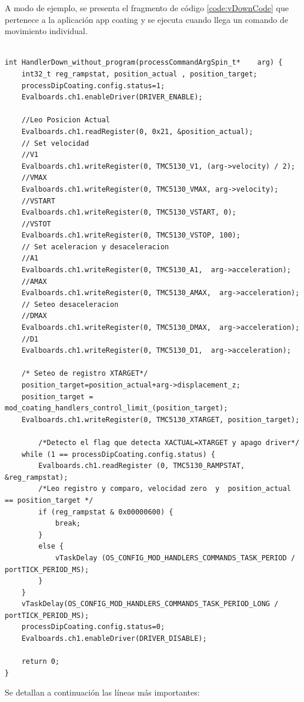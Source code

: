 A modo de ejemplo, se presenta el fragmento de código \ref{code:vDownCode} que pertenece a la aplicación app coating y se ejecuta cuando llega un comando de movimiento individual.


\begin{lstlisting}[label=code:vDownCode,caption=Ejecución de comando DOWN.] % 

int HandlerDown_without_program(processCommandArgSpin_t*	arg) {
	int32_t reg_rampstat, position_actual , position_target;
	processDipCoating.config.status=1;
	Evalboards.ch1.enableDriver(DRIVER_ENABLE);

	//Leo Posicion Actual
	Evalboards.ch1.readRegister(0, 0x21, &position_actual);
	// Set velocidad
	//V1
	Evalboards.ch1.writeRegister(0, TMC5130_V1, (arg->velocity) / 2);
	//VMAX
	Evalboards.ch1.writeRegister(0, TMC5130_VMAX, arg->velocity);
	//VSTART
	Evalboards.ch1.writeRegister(0, TMC5130_VSTART, 0);
	//VSTOT
	Evalboards.ch1.writeRegister(0, TMC5130_VSTOP, 100);
	// Set aceleracion y desaceleracion
	//A1
	Evalboards.ch1.writeRegister(0, TMC5130_A1,  arg->acceleration);
	//AMAX
	Evalboards.ch1.writeRegister(0, TMC5130_AMAX,  arg->acceleration);
	// Seteo desaceleracion
	//DMAX
	Evalboards.ch1.writeRegister(0, TMC5130_DMAX,  arg->acceleration);
	//D1
	Evalboards.ch1.writeRegister(0, TMC5130_D1,  arg->acceleration);

	/* Seteo de registro XTARGET*/
	position_target=position_actual+arg->displacement_z;
	position_target = mod_coating_handlers_control_limit_(position_target);
	Evalboards.ch1.writeRegister(0, TMC5130_XTARGET, position_target);

		/*Detecto el flag que detecta XACTUAL=XTARGET y apago driver*/
	while (1 == processDipCoating.config.status) {
		Evalboards.ch1.readRegister (0, TMC5130_RAMPSTAT, &reg_rampstat);
		/*Leo registro y comparo, velocidad zero  y  position_actual == position_target */
		if (reg_rampstat & 0x00000600) {
			break;
		}
		else {
			vTaskDelay (OS_CONFIG_MOD_HANDLERS_COMMANDS_TASK_PERIOD / portTICK_PERIOD_MS);
		}
	}
	vTaskDelay(OS_CONFIG_MOD_HANDLERS_COMMANDS_TASK_PERIOD_LONG / portTICK_PERIOD_MS);
	processDipCoating.config.status=0;
	Evalboards.ch1.enableDriver(DRIVER_DISABLE);

	return 0;
}
\end{lstlisting}

Se detallan a continuación las líneas más importantes:

